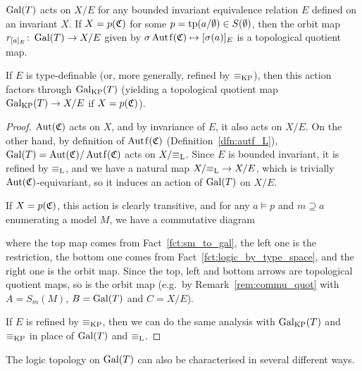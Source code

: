 	
	\begin{prop}
		\label{prop:gal_action}
		$\operatorname{{Gal}}(T)$ acts on $X/E$ for any bounded invariant equivalence relation $E$ defined on an invariant $X$. If $X=p({\mathfrak C})$ for some $p=\operatorname{{tp}}(a/\emptyset) \in S(\emptyset)$, then the orbit map $r_{[a]_E} \colon \operatorname{{Gal}}(T) \to X/E$ given by $\sigma \Autf(\fC) \mapsto [\sigma(a)]_E$ is a topological quotient map.
		
		If $E$ is type-definable (or, more generally, refined by $\equiv_{\mathrm{KP}}$), then this action factors through $\operatorname{{Gal}}_{\mathrm{KP}}(T)$ (yielding a topological quotient map $\operatorname{{Gal}}_{\mathrm{KP}}(T)\to X/E$ if $X=p({\mathfrak C})$).
	\end{prop}
	\begin{proof}
		$\operatorname{{Aut}}({\mathfrak C})$ acts on $X$, and by invariance of $E$, it also acts on $X/E$. On the other hand, by definition of $\Autf(\fC)$ (Definition~\ref{dfn:autf_L}), $\Gal(T)=\Aut(\fC)/\Autf(\fC)$ acts on $X/{\equiv_{\mathrm{L}}}$. Since $E$ is bounded invariant, it is refined by $\equiv_{\mathrm{L}}$, and we have a natural map $X/{\equiv_{\mathrm{L}}}\to X/E$, which is trivially $\operatorname{{Aut}}({\mathfrak C})$-equivariant, so it induces an action of $\operatorname{{Gal}}(T)$ on $X/E$.
		
		If $X=p({\mathfrak C})$, this action is clearly transitive, and for any $a\models p$ and $m\supseteq a$ enumerating a model $M$, we have a commutative diagram
		\begin{center}
		\end{center}
		where the top map comes from Fact~\ref{fct:sm_to_gal}, the left one is the restriction, the bottom one comes from Fact~\ref{fct:logic_by_type_space}, and the right one is the orbit map. Since the top, left and bottom arrows are topological quotient maps, so is the orbit map (e.g.\ by Remark~\ref{rem:commu_quot} with $A=S_m(M)$, $B=\operatorname{{Gal}}(T)$ and $C=X/E$).
		
		If $E$ is refined by $\equiv_{\mathrm{KP}}$, then we can do the same analysis with $\operatorname{{Gal}}_{\mathrm{KP}}(T)$ and $\equiv_{\mathrm{KP}}$ in place of $\operatorname{{Gal}}(T)$ and $\equiv_{\mathrm{L}}$.
	\end{proof}
	
	
	The logic topology on $\operatorname{{Gal}}(T)$ can also be characterised in several different ways.
	
